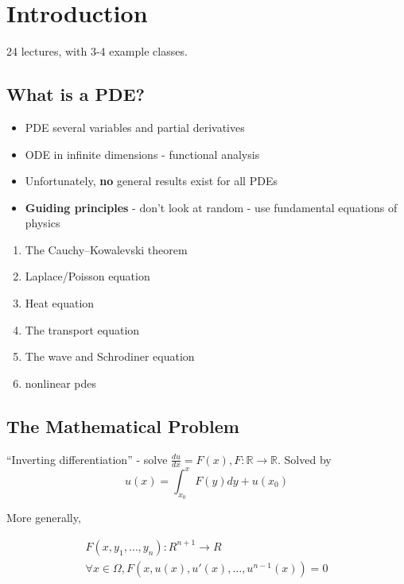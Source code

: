 
\chapter{Introduction}
\label{cha:introduction}

24 lectures, with 3-4 example classes.

\section{What is a PDE?}
\label{sec:what-pde}

\begin{itemize}
\item PDE several variables and partial derivatives
\item ODE in infinite dimensions - functional analysis
\item Unfortunately, \textbf{no} general results exist for all PDEs
\item \textbf{Guiding principles} - don't look at random - use
  fundamental equations of physics
\end{itemize}

\begin{enumerate}
\item The Cauchy–Kowalevski theorem
\item Laplace/Poisson equation
\item Heat equation
\item The transport equation
\item The wave and Schrodiner equation
\item nonlinear pdes
\end{enumerate}

\section{The Mathematical Problem}
\label{sec:mathematical-problem}

``Inverting differentiation'' - solve $\frac{du}{dx} = F(x),  F:
\mathbb{R} \rightarrow \mathbb{R}$. Solved by
\begin{equation}
  \label{eq:2}
  u(x) = \int_{x_{0}}^{x} F(y)dy + u(x_{0})
\end{equation}

More generally, 

\begin{align}
  \label{eq:3}
  F(x, y_{1}, \dots, y_{n}) : R^{n+1} \rightarrow R \\
  \forall x \in \Omega, F(x, u(x), u'(x), \dots, u^{n-1}(x)) = 0
\end{align}

